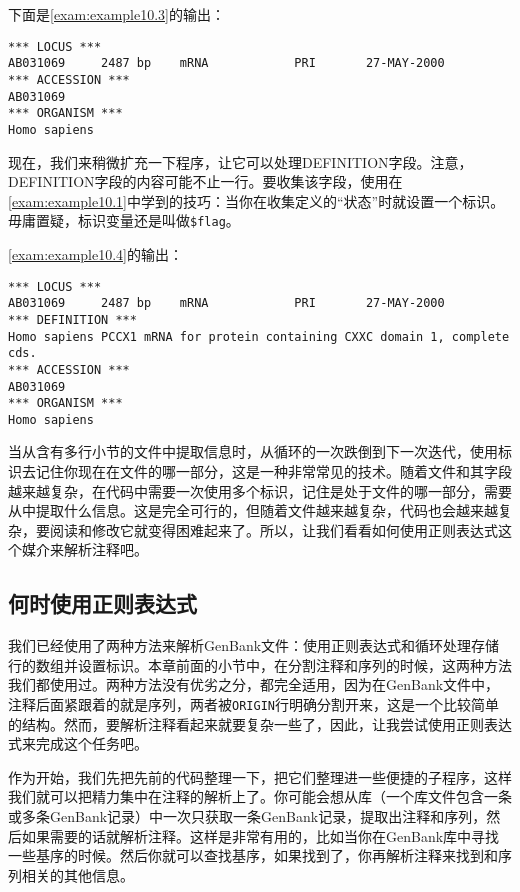 下面是\autoref{exam:example10.3}的输出：

\begin{lstlisting}
*** LOCUS ***
AB031069     2487 bp    mRNA            PRI       27-MAY-2000
*** ACCESSION ***
AB031069
*** ORGANISM ***
Homo sapiens
\end{lstlisting}

现在，我们来稍微扩充一下程序，让它可以处理DEFINITION字段。注意，DEFINITION字段的内容可能不止一行。要收集该字段，使用在\autoref{exam:example10.1}中学到的技巧：当你在收集定义的“状态”时就设置一个标识。毋庸置疑，标识变量还是叫做\verb|$flag|。



\autoref{exam:example10.4}的输出：

\begin{lstlisting}
*** LOCUS ***
AB031069     2487 bp    mRNA            PRI       27-MAY-2000
*** DEFINITION ***
Homo sapiens PCCX1 mRNA for protein containing CXXC domain 1, complete
cds.
*** ACCESSION ***
AB031069
*** ORGANISM ***
Homo sapiens
\end{lstlisting}

当从含有多行小节的文件中提取信息时，从循环的一次跌倒到下一次迭代，使用标识去记住你现在在文件的哪一部分，这是一种非常常见的技术。随着文件和其字段越来越复杂，在代码中需要一次使用多个标识，记住是处于文件的哪一部分，需要从中提取什么信息。这是完全可行的，但随着文件越来越复杂，代码也会越来越复杂，要阅读和修改它就变得困难起来了。所以，让我们看看如何使用正则表达式这个媒介来解析注释吧。

\subsection{何时使用正则表达式}
我们已经使用了两种方法来解析GenBank文件：使用正则表达式和循环处理存储行的数组并设置标识。本章前面的小节中，在分割注释和序列的时候，这两种方法我们都使用过。两种方法没有优劣之分，都完全适用，因为在GenBank文件中，注释后面紧跟着的就是序列，两者被\verb|ORIGIN|行明确分割开来，这是一个比较简单的结构。然而，要解析注释看起来就要复杂一些了，因此，让我尝试使用正则表达式来完成这个任务吧。

作为开始，我们先把先前的代码整理一下，把它们整理进一些便捷的子程序，这样我们就可以把精力集中在注释的解析上了。你可能会想从库（一个库文件包含一条或多条GenBank记录）中一次只获取一条GenBank记录，提取出注释和序列，然后如果需要的话就解析注释。这样是非常有用的，比如当你在GenBank库中寻找一些基序的时候。然后你就可以查找基序，如果找到了，你再解析注释来找到和序列相关的其他信息。

